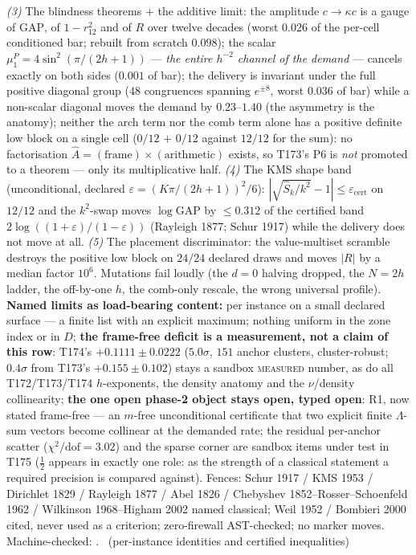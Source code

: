 \documentclass[11pt,a4paper]{article}
\begin{document}
\emph{(3)} The blindness theorems $+$ the additive limit: the amplitude
$c\to\kappa c$ is a gauge of $\mathrm{GAP}$, of $1-r_{12}^2$ and of $R$
over twelve decades (worst $0.026$ of the per-cell conditioned bar;
rebuilt from scratch $0.098$); the scalar
$\mu^P_1=4\sin^2(\pi/(2h+1))$ --- \emph{the entire $h^{-2}$ channel of
the demand} --- cancels exactly on both sides ($0.001$ of bar); the
delivery is invariant under the full positive diagonal group ($48$
congruences spanning $e^{\pm8}$, worst $0.036$ of bar) while a
non-scalar diagonal moves the demand by $0.23$--$1.40$ (the asymmetry
is the anatomy); neither the arch term nor the comb term alone has a
positive definite low block on a single cell ($0/12$ $+$ $0/12$ against
$12/12$ for the sum): no factorisation
$\hat A=(\mathrm{frame})\times(\mathrm{arithmetic})$ exists, so T173's
P6 is \emph{not} promoted to a theorem --- only its multiplicative
half.
\emph{(4)} The KMS shape band (unconditional, declared
$\varepsilon=(K\pi/(2h+1))^2/6$): $|\sqrt{\hat S_k/k^2}-1|\le
\varepsilon_{\mathrm{cert}}$ on $12/12$ and the $k^2$-swap moves
$\log\mathrm{GAP}$ by $\le0.312$ of the certified band
$2\log((1+\varepsilon)/(1-\varepsilon))$ (Rayleigh 1877; Schur 1917)
while the delivery does not move at all.
\emph{(5)} The placement discriminator: the value-multiset scramble
destroys the positive low block on $24/24$ declared draws and moves
$|R|$ by a median factor $10^{6}$. Mutations fail loudly (the $d=0$
halving dropped, the $N=2h$ ladder, the off-by-one $h$, the comb-only
rescale, the wrong universal profile).
\textbf{Named limits as load-bearing content:} per instance on a small
declared surface --- a finite list with an explicit maximum; nothing
uniform in the zone index or in $D$; \textbf{the frame-free deficit is
a measurement, not a claim of this row}: T174's $+0.1111\pm0.0222$
($5.0\sigma$, $151$ anchor clusters, cluster-robust; $0.4\sigma$ from
T173's $+0.155\pm0.102$) stays a sandbox \textsc{measured} number, as
do all T172/T173/T174 $h$-exponents, the density anatomy and the
$\nu$/density collinearity; \textbf{the one open phase-2 object stays
open, typed open}: R1, now stated frame-free --- an $m$-free
unconditional certificate that two explicit finite $\Lambda$-sum
vectors become collinear at the demanded rate; the residual per-anchor
scatter ($\chi^2/\mathrm{dof}=3.02$) and the sparse corner are sandbox
items under test in T175 ($\tfrac12$ appears in exactly one role: as
the strength of a classical statement a required precision is compared
against).
Fences: Schur 1917 / KMS 1953 / Dirichlet 1829 / Rayleigh 1877 / Abel
1826 / Chebyshev 1852--Rosser--Schoenfeld 1962 / Wilkinson 1968--Higham
2002 named classical; Weil 1952 / Bombieri 2000 cited, never used as a
criterion; zero-firewall AST-checked; no marker moves.
Machine-checked: .
\mE\ (per-instance identities and certified inequalities)
\end{document}
